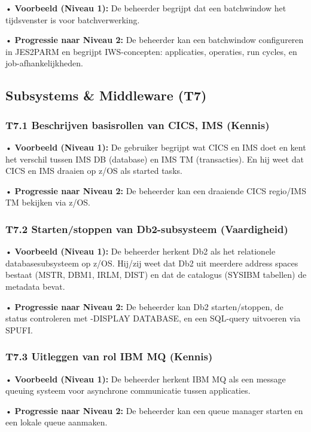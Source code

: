 • \textbf{Voorbeeld (Niveau 1):} De beheerder begrijpt dat een batchwindow het tijdsvenster is voor batchverwerking.

• \textbf{Progressie naar Niveau 2:} De beheerder kan een batchwindow configureren in JES2PARM en begrijpt IWS-concepten: applicaties, operaties, run cycles, en job-afhankelijkheden.

\subsection{Subsystems \& Middleware (T7)}

\subsubsection{T7.1 Beschrijven basisrollen van CICS, IMS (Kennis)}

• \textbf{Voorbeeld (Niveau 1):} De gebruiker begrijpt wat CICS en IMS doet en kent het verschil tussen IMS DB (database) en IMS TM (transacties). En hij weet dat CICS en IMS draaien op z/OS als started tasks. 

• \textbf{Progressie naar Niveau 2:} De beheerder kan een draaiende CICS regio/IMS TM bekijken via z/OS. 

\subsubsection{T7.2 Starten/stoppen van Db2-subsysteem (Vaardigheid)}

• \textbf{Voorbeeld (Niveau 1):} De beheerder herkent Db2 als het relationele databasesubsysteem op z/OS. Hij/zij weet dat Db2 uit meerdere address spaces bestaat (MSTR, DBM1, IRLM, DIST) en dat de catalogus (SYSIBM tabellen) de metadata bevat.

• \textbf{Progressie naar Niveau 2:} De beheerder kan Db2 starten/stoppen, de status controleren met {-DISPLAY DATABASE}, en een SQL-query uitvoeren via SPUFI.
\subsubsection{T7.3 Uitleggen van rol IBM MQ (Kennis)}

• \textbf{Voorbeeld (Niveau 1):} De beheerder herkent IBM MQ als een message queuing systeem voor asynchrone communicatie tussen applicaties.

• \textbf{Progressie naar Niveau 2:} De beheerder kan een queue manager starten en een lokale queue aanmaken.

